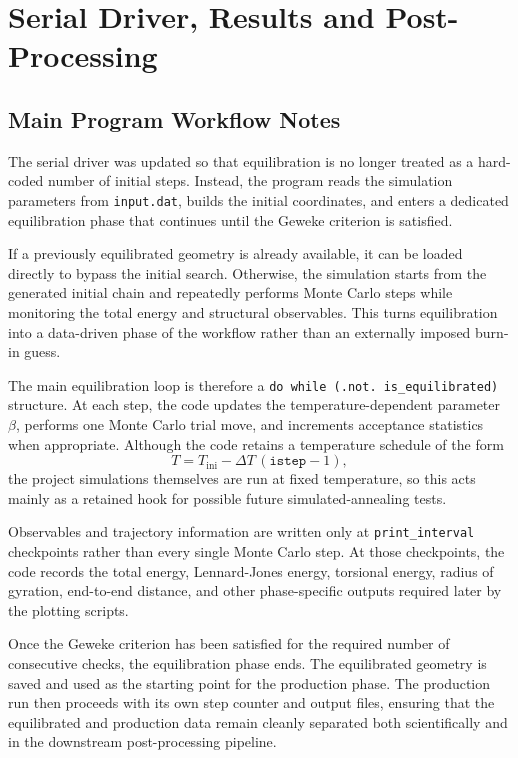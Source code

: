 
\section{Serial Driver, Results and Post-Processing}
\label{sec:serial_post}

\subsection{Main Program Workflow Notes}

The serial driver was updated so that equilibration is no longer treated
as a hard-coded number of initial steps. Instead, the program reads the
simulation parameters from \texttt{input.dat}, builds the initial
coordinates, and enters a dedicated equilibration phase that continues
until the Geweke criterion is satisfied.

If a previously equilibrated geometry is already available, it can be
loaded directly to bypass the initial search. Otherwise, the simulation
starts from the generated initial chain and repeatedly performs Monte
Carlo steps while monitoring the total energy and structural
observables. This turns equilibration into a data-driven phase of the
workflow rather than an externally imposed burn-in guess.

The main equilibration loop is therefore a \texttt{do while
(.not. is\_equilibrated)} structure. At each step, the code updates the
temperature-dependent parameter \(\beta\), performs one Monte Carlo
trial move, and increments acceptance statistics when appropriate.
Although the code retains a temperature schedule of the form
\[
T = T_{\mathrm{ini}} - \Delta T \, (\texttt{istep}-1),
\]
the project simulations themselves are run at fixed temperature, so this
acts mainly as a retained hook for possible future simulated-annealing
tests.

Observables and trajectory information are written only at
\texttt{print\_interval} checkpoints rather than every single Monte
Carlo step. At those checkpoints, the code records the total energy,
Lennard-Jones energy, torsional energy, radius of gyration, end-to-end
distance, and other phase-specific outputs required later by the
plotting scripts.

Once the Geweke criterion has been satisfied for the required number of
consecutive checks, the equilibration phase ends. The equilibrated
geometry is saved and used as the starting point for the production
phase. The production run then proceeds with its own step counter and
output files, ensuring that the equilibrated and production data remain
cleanly separated both scientifically and in the downstream
post-processing pipeline.

